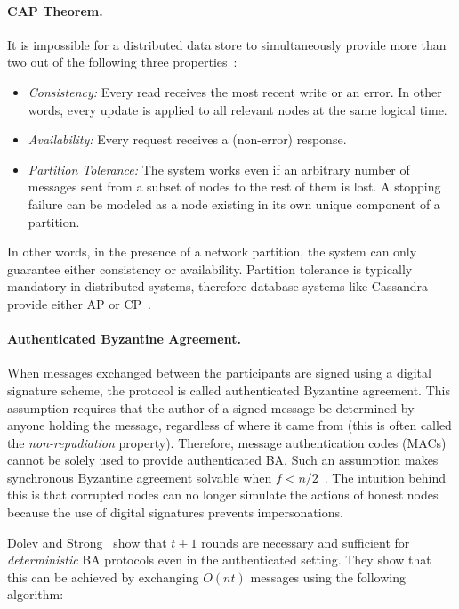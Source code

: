 \documentclass[11pt]{article}
\theoremstyle{mytheoremstyle}
\begin{document}
\paragraph{CAP Theorem.} It is impossible for a distributed data store to simultaneously provide more than two out of the following three properties~\cite{gilbert2002brewer}: 
\begin{itemize}
	\item \textit{Consistency:} Every read receives the most recent write or an error. In other words, every update is applied to all relevant nodes at the same logical time.
	\item \textit{Availability:} Every request receives a (non-error) response.
	\item \textit{Partition Tolerance:} The system works even if an arbitrary number of messages sent from a subset of nodes to the rest of them is lost. A stopping failure can be modeled as a node existing in its own unique component of a partition.
\end{itemize}
In other words, in the presence of a network partition, the system can only guarantee either consistency or availability. Partition tolerance is typically mandatory in distributed systems, therefore database systems like Cassandra provide either AP or CP~\cite{Howareco45:online,partition:2010}.

\paragraph{Authenticated Byzantine Agreement.}
When messages exchanged between the participants are signed using a digital signature scheme, the protocol is called authenticated Byzantine agreement. This assumption requires that the author of a signed message be determined by anyone holding the message, regardless of where it came from (this is often called the \emph{non-repudiation} property). Therefore, message authentication codes (MACs) cannot be solely used to provide authenticated BA. Such an assumption makes synchronous Byzantine agreement solvable when $f<n/2$~\cite{srini2017}. The intuition behind this is that corrupted nodes can no longer simulate the actions of honest nodes because the use of digital signatures prevents impersonations.

Dolev and Strong~\cite{Dolev:Strong:83} show that $t + 1$ rounds are necessary and sufficient for \emph{deterministic} BA protocols even in the authenticated setting. They show that this can be achieved by exchanging $O(nt)$ messages using the following algorithm:
\end{document}
